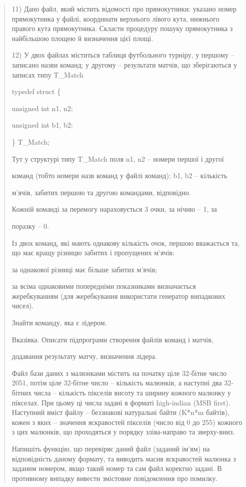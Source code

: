 \documentclass[]{article}
\begin{document}
\begin{quote}
11) Дано файл, який містить відомості про прямокутники: указано номер
прямокутника у файлі, координати верхнього лівого кута, нижнього правого
кута прямокутника. Скласти процедуру пошуку прямокутника з найбільшою
площею й визначення цієї площі.

12) \protect\hypertarget{_Hlk65238015}{}{}У двох файлах міститься
таблиця футбольного турніру, у першому -- записано назви команд; у
другому -- результати матчів, що зберігаються у записах типу T\_Match

typedef struct \{

unsigned int n1, n2;

unsigned int b1, b2;

\} T\_Match;

Тут у структурі типу T\_Match поля n1, n2 -- номери першої і другої

команд (тобто номери назв команд у файлі команд); b1, b2 -- кількість

м'ячів, забитих першою та другою командами, відповідно.

Кожній команді за перемогу нараховується 3 очки, за нічию -- 1, за

поразку -- 0.

Із двох команд, які мають однакову кількість очок, першою вважається та,
що має кращу різницю забитих і пропущених м'ячів;

за однакової різниці має більше забитих м'ячів;

за всіма однаковими попередніми показниками визначається жеребкуванням
(для жеребкування використати генератор випадкових чисел).

Знайти команду, яка є лідером.

Вказівка. Описати підпрограми створення файлів команд і матчів,

додавання результату матчу, визначення лідера.

Файл бази даних з малюнками містить на початку ціле 32-бітне число 2051,
потім ціле 32-бітне число -- кількість малюнків, а наступні два
32-бітних числа -- кількість пікселів висоту та ширину кожного малюнку у
пікселах. При цьому ці числа задані в форматі high-indian (MSB first).
Наступний вміст файлу -- беззнакові натуральні байти (K*n*m байтів),
кожен з яких -- значення яскравостей пікселів (число від 0 до 255)
кожного з цих малюнків, що проходяться у порядку зліва-направо та
зверху-вниз.

Напишіть функцію, що перевіряє даний файл (заданий ім'ям) на
відповідність даному формату, та виводить масив яскравостей малюнка з
заданим номером, якщо такий номер та сам файл коректно задані. В
противному випадку вивести змістовне повідомлення про помилку.


\end{quote}
\end{document}

